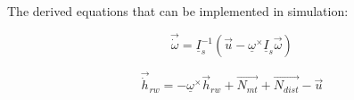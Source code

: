 The derived equations that can be implemented in simulation:

\begin{equation}
\vec{\dot{\omega}} = \underline{I}_{s}^{-1}\left( \vec{u} -  \underline{\omega}^\times\underline{I}_{s}\vec{\omega}  \right) 
\end{equation}

\begin{equation}
\vec{\dot{h}}_{rw} =  -  \underline{\omega}^\times \vec{{h}}_{rw} + \vec{N_{mt}}  + \vec{N_{dist}} - \vec{u} 
\end{equation}


\cite{DesatYang}